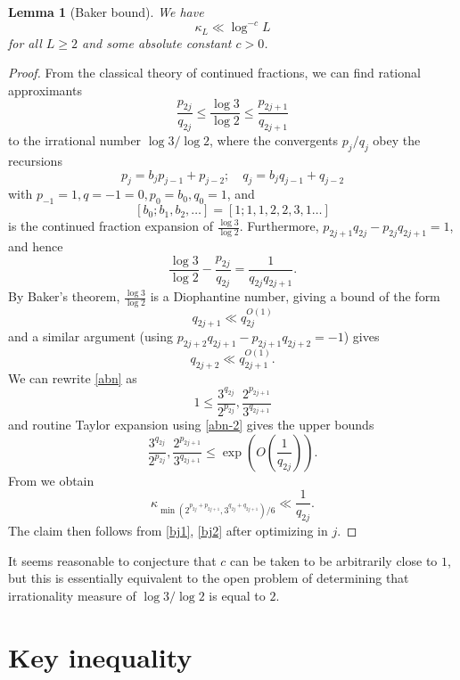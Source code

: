 \documentclass[12pt,a4paper,reqno]{amsart}
\numberwithin{equation}{section}
\theoremstyle{plain}
\newtheorem{lemma}[theorem]{Lemma}
\theoremstyle{definition}
\begin{document}
\begin{lemma}[Baker bound]\label{baker} We have
  $$ \kappa_L \ll \log^{-c} L$$
for all $L \geq 2$ and some absolute constant $c>0$.
\end{lemma}


\begin{proof}  From the classical theory of continued fractions, we can find rational approximants
\begin{equation}\label{abn}
 \frac{p_{2j}}{q_{2j}} \leq \frac{\log 3}{\log 2} \leq \frac{p_{2j+1}}{q_{2j+1}}
\end{equation}
to the irrational number $\log 3/\log 2$, where the convergents $p_j/q_j$ obey the recursions
$$ p_j = b_j p_{j-1} + p_{j-2}; \quad q_j = b_j q_{j-1} + q_{j-2}$$
with $p_{-1} = 1, q={-1}=0, p_0 = b_0, q_0=1$, and 
$$[b_0;b_1,b_2,\dots] = [1;1,1,2,2,3,1\dots]$$ 
is the continued fraction expansion of $\frac{\log 3}{\log 2}$.  Furthermore, $p_{2j+1}q_{2j} - p_{2j} q_{2j+1} = 1$, and hence
\begin{equation}\label{abn-2} 
  \frac{\log 3}{\log 2} - \frac{p_{2j}}{q_{2j}} = \frac{1}{q_{2j} q_{2j+1}}.
\end{equation}
By Baker's theorem, $\frac{\log 3}{\log 2}$ is a Diophantine number, giving a bound of the form
\begin{equation}\label{bj1}
   q_{2j+1} \ll q_{2j}^{O(1)}
\end{equation}
and a similar argument (using $p_{2j+2} q_{2j+1}-p_{2j+1} q_{2j+2} = -1$) gives
\begin{equation}\label{bj2}
 q_{2j+2} \ll q_{2j+1}^{O(1)}.
\end{equation}
We can rewrite \eqref{abn} as
$$ 1 \leq \frac{3^{q_{2j}}}{2^{p_{2j}}}, \frac{2^{p_{2j+1}}}{3^{q_{2j+1}}}$$
and routine Taylor expansion using \eqref{abn-2} gives the upper bounds
$$ \frac{3^{q_{2j}}}{2^{p_{2j}}}, \frac{2^{p_{2j+1}}}{3^{q_{2j+1}}}\leq \exp\left( O\left( \frac{1}{q_{2j}}\right)\right).$$
From  we obtain
$$
\kappa_{\min(2^{p_{2j} + p_{2j+1}}, 3^{q_{2j}+q_{2j+1}})/6} \ll \frac{1}{q_{2j}}.$$
The claim then follows from \eqref{bj1}, \eqref{bj2} after optimizing in $j$.

\end{proof}


It seems reasonable to conjecture that $c$ can be taken to be arbitrarily close to $1$, but this is essentially equivalent to the open problem of determining that irrationality measure of $\log 3 / \log 2$ is equal to $2$.


\section{Key inequality}\label{key-app}
\end{document}
